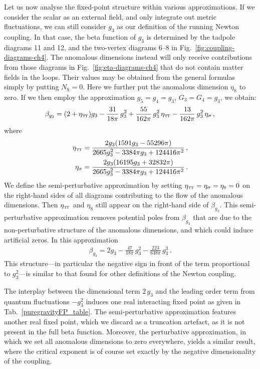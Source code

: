 \documentclass[11pt]{book} %
\newcommand\TTspace{ -1pt }
\newcommand\etaTT{ \eta_{\scriptscriptstyle{\mathrm{T\hspace{\TTspace}T}}} }
\newcommand\etaS{ \eta_{\scriptscriptstyle{\mathrm{S}}} }
\newcommand\NS{ N_{\scriptscriptstyle{\mathrm{S}}} }
\numberwithin{equation}{chapter}
\begin{document}
Let us now analyse the fixed-point structure within various approximations.
If we consider the scalar as an external field, and only integrate out metric fluctuations,
we can still consider $g_3$ as our definition of the running Newton coupling.
In that case, the beta function of ${g_3}$ is determined by the tadpole diagrams 11 and 12,
and the two-vertex diagrams 6--8 in Fig.~\ref{fig:coupling-diagrams-ch4}.
The anomalous dimensions instead will only receive contributions from those diagrams
in Fig.~\ref{fig:eta-diagrams-ch4}
that do not contain matter fields in the loops.
Their values may be obtained from the general formulas simply by putting $\NS=0$.
Here we further put the anomalous dimension $\etaS$ to zero.
If we then employ the approximation $g_5 = g_4 = g_3$, $G_3 = G_4 = g_3$, we obtain:
\begin{align}
  \beta_{g_3} = (2+\etaTT) g_3
              - \frac{31}{18 \pi} \, g_3^2
              + \frac{55}{162\pi} \, g_3^2 \, \etaTT
              - \frac{13}{162\pi} \, g_3^2 \, \eta_\sigma \,,
\end{align}
where
\begin{align}
  \etaTT      &= \frac{2g_3(1591 g_3-55296 \pi)}{2665 g_3^2-3384\pi g_3 +124416 \pi^2}  \,, \\
  \eta_\sigma &= \frac{2g_3(16195 g_3+32832 \pi)}{2665 g_3^2-3384\pi g_3 +124416 \pi^2} \,.
\end{align}
We define the semi-perturbative approximation by setting
$\etaTT = \eta_{\sigma} = \etaS = 0$ on the right-hand sides of all diagrams contributing
to the flow of the anomalous dimensions.
Then $\etaTT$ and $\etaS$ still appear on the right-hand side of $\beta_{g_3}$.
This semi-perturbative approximation removes potential poles from $\beta_{g_3}$ that are
due to the non-perturbative structure of the anomalous dimensions,
and which could induce artificial zeros.  In this approximation
\begin{align}
  \beta_{g_3} = 2g_3 - \frac{47}{18 \pi} \, g_3^2 - \frac{223}{648\pi} \, g_3^3 \,.
  \label{purgravitysemipertbeta}
\end{align}
This structure---in particular the negative sign in front of the term proportional to $g_3^2$---is
similar to that found for other definitions of the Newton coupling.

The interplay between the dimensional term $2 \, g_3$ and the leading order term from quantum fluctuations
$-g_3^2$ induces one real interacting fixed point as given in Tab.~\ref{puregravityFP_table}.
The semi-perturbative approximation features another real fixed point,
which we discard as a truncation artefact, as it is not present in the full beta function.
Moreover, the perturbative approximation, in which we set all anomalous dimensions to zero everywhere,
yields a similar result, where the critical exponent is of course set exactly by the negative dimensionality
of the coupling.
\end{document}
